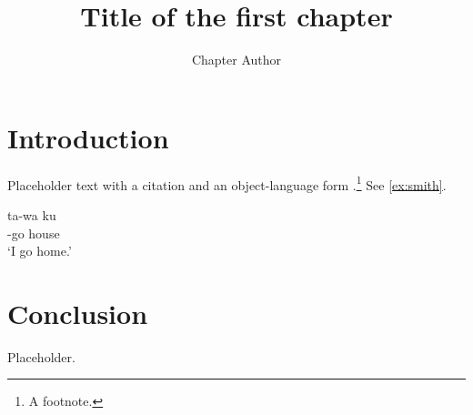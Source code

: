 \documentclass[profile=langsci, bibfile=../references.bib]{uhmqp}
\title{Title of the first chapter}
\author{Chapter Author}
\affiliation{University of Hawaiʻi at Mānoa}
\begin{document}
\maketitle

\section{Introduction}\label{sec:smith-intro}
Placeholder text with a citation \parencite[514--515]{murray-vennemann1983}
and an object-language form 
.\footnote{A footnote.} See \cref{ex:smith}.

\ea\label{ex:smith}
  \gll ta-wa ku\\
       \Fsg-go house\\
  \glt `I go home.' 
\z

\section{Conclusion}
Placeholder.

\printbibliography
\end{document}
